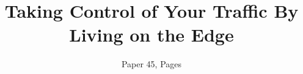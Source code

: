 \documentclass[letterpaper,twocolumn,10pt]{article}
\begin{document}
\setlength{\droptitle}{-1.5cm}

\title{\LARGE Taking Control of Your Traffic By Living on the Edge}
\author{Paper 45, \pageref{p:end} Pages}

\date{\vspace{-12mm}}

\maketitle

\begin{sloppypar}











\end{sloppypar}
\label{p:end}
\clearpage


\end{document}
